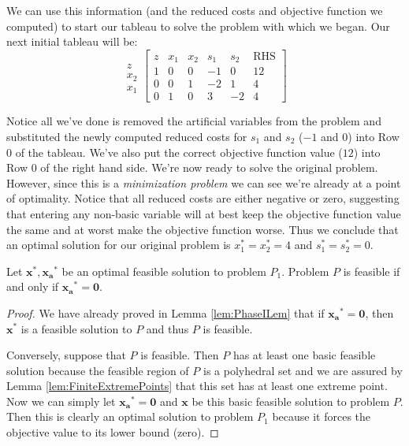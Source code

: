 \begin{example}
We can use this information (and the reduced costs and objective function we computed) to start our tableau to solve the problem with which we began. Our next initial tableau will be:
\begin{equation}
\begin{array}{c}
\\
z\\
x_{2}\\
x_{1}
\end{array}
\left[
\begin{array}{c|cccc|c}
z & x_1 & x_2 & s_1 & s_2  & \text{RHS}\\
\hline
1 & 0 & 0 & -1 & 0 & 12\\
\hline
0 & 0 & 1 & -2 & 1  & 4\\
0 & 1 & 0 & 3  & -2 & 4
\end{array}
\right]
\end{equation}

Notice all we've done is removed the artificial variables from the problem and substituted the newly computed reduced costs for $s_1$ and $s_2$ ($-1$ and $0$) into Row 0 of the tableau. We've also put the correct objective function value ($12$) into Row 0 of the right hand side. We're now ready to solve the original problem. However, since this is a \textit{minimization problem} we can see we're already at a point of optimality. Notice that all reduced costs are either negative or zero, suggesting that entering any non-basic variable will at best keep the objective function value the same and at worst make the objective function worse. Thus we conclude that an optimal solution for our original problem is $x^*_1 = x^*_2 = 4$ and $s^*_1 = s^*_2 = 0$.
\end{example}

\begin{theorem} Let $\mathbf{x}^*,\mathbf{x_a}^*$ be an optimal feasible solution to problem $P_1$. Problem $P$ is feasible if and only if $\mathbf{x_a}^*=\mathbf{0}$.
\end{theorem}
\begin{proof} We have already proved in Lemma \ref{lem:PhaseILem} that if $\mathbf{x_a}^*=\mathbf{0}$, then $\mathbf{x}^*$ is a feasible solution to $P$ and thus $P$ is feasible. 

Conversely, suppose that $P$ is feasible. Then $P$ has at least one basic feasible solution because the feasible region of $P$ is a polyhedral set and we are assured by Lemma \ref{lem:FiniteExtremePoints} that this set has at least one extreme point. Now we can simply let $\mathbf{x_a}^* = \mathbf{0}$ and $\mathbf{x}$ be this basic feasible solution to problem $P$. Then this is clearly an optimal solution to problem $P_1$ because it forces the objective value to its lower bound (zero).
\end{proof}

